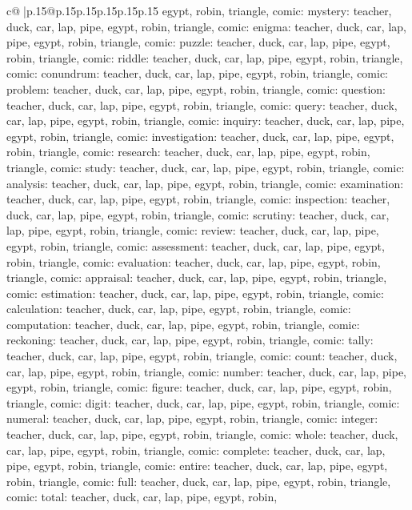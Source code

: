 \documentclass{article}
\begin{document}
{\begin{supertabular}{c@{$\;$}|p{.15\linewidth}@{}p{.15\linewidth}p{.15\linewidth}p{.15\linewidth}p{.15\linewidth}p{.15\linewidth}}
{{{egypt, robin, triangle, comic\n\nCLUE: mystery\nTARGETS: teacher, duck, car, lap, pipe, egypt, robin, triangle, comic\n\nCLUE: enigma\nTARGETS: teacher, duck, car, lap, pipe, egypt, robin, triangle, comic\n\nCLUE: puzzle\nTARGETS: teacher, duck, car, lap, pipe, egypt, robin, triangle, comic\n\nCLUE: riddle\nTARGETS: teacher, duck, car, lap, pipe, egypt, robin, triangle, comic\n\nCLUE: conundrum\nTARGETS: teacher, duck, car, lap, pipe, egypt, robin, triangle, comic\n\nCLUE: problem\nTARGETS: teacher, duck, car, lap, pipe, egypt, robin, triangle, comic\n\nCLUE: question\nTARGETS: teacher, duck, car, lap, pipe, egypt, robin, triangle, comic\n\nCLUE: query\nTARGETS: teacher, duck, car, lap, pipe, egypt, robin, triangle, comic\n\nCLUE: inquiry\nTARGETS: teacher, duck, car, lap, pipe, egypt, robin, triangle, comic\n\nCLUE: investigation\nTARGETS: teacher, duck, car, lap, pipe, egypt, robin, triangle, comic\n\nCLUE: research\nTARGETS: teacher, duck, car, lap, pipe, egypt, robin, triangle, comic\n\nCLUE: study\nTARGETS: teacher, duck, car, lap, pipe, egypt, robin, triangle, comic\n\nCLUE: analysis\nTARGETS: teacher, duck, car, lap, pipe, egypt, robin, triangle, comic\n\nCLUE: examination\nTARGETS: teacher, duck, car, lap, pipe, egypt, robin, triangle, comic\n\nCLUE: inspection\nTARGETS: teacher, duck, car, lap, pipe, egypt, robin, triangle, comic\n\nCLUE: scrutiny\nTARGETS: teacher, duck, car, lap, pipe, egypt, robin, triangle, comic\n\nCLUE: review\nTARGETS: teacher, duck, car, lap, pipe, egypt, robin, triangle, comic\n\nCLUE: assessment\nTARGETS: teacher, duck, car, lap, pipe, egypt, robin, triangle, comic\n\nCLUE: evaluation\nTARGETS: teacher, duck, car, lap, pipe, egypt, robin, triangle, comic\n\nCLUE: appraisal\nTARGETS: teacher, duck, car, lap, pipe, egypt, robin, triangle, comic\n\nCLUE: estimation\nTARGETS: teacher, duck, car, lap, pipe, egypt, robin, triangle, comic\n\nCLUE: calculation\nTARGETS: teacher, duck, car, lap, pipe, egypt, robin, triangle, comic\n\nCLUE: computation\nTARGETS: teacher, duck, car, lap, pipe, egypt, robin, triangle, comic\n\nCLUE: reckoning\nTARGETS: teacher, duck, car, lap, pipe, egypt, robin, triangle, comic\n\nCLUE: tally\nTARGETS: teacher, duck, car, lap, pipe, egypt, robin, triangle, comic\n\nCLUE: count\nTARGETS: teacher, duck, car, lap, pipe, egypt, robin, triangle, comic\n\nCLUE: number\nTARGETS: teacher, duck, car, lap, pipe, egypt, robin, triangle, comic\n\nCLUE: figure\nTARGETS: teacher, duck, car, lap, pipe, egypt, robin, triangle, comic\n\nCLUE: digit\nTARGETS: teacher, duck, car, lap, pipe, egypt, robin, triangle, comic\n\nCLUE: numeral\nTARGETS: teacher, duck, car, lap, pipe, egypt, robin, triangle, comic\n\nCLUE: integer\nTARGETS: teacher, duck, car, lap, pipe, egypt, robin, triangle, comic\n\nCLUE: whole\nTARGETS: teacher, duck, car, lap, pipe, egypt, robin, triangle, comic\n\nCLUE: complete\nTARGETS: teacher, duck, car, lap, pipe, egypt, robin, triangle, comic\n\nCLUE: entire\nTARGETS: teacher, duck, car, lap, pipe, egypt, robin, triangle, comic\n\nCLUE: full\nTARGETS: teacher, duck, car, lap, pipe, egypt, robin, triangle, comic\n\nCLUE: total\nTARGETS: teacher, duck, car, lap, pipe, egypt, robin, }}}
\end{supertabular}}
\end{document}
